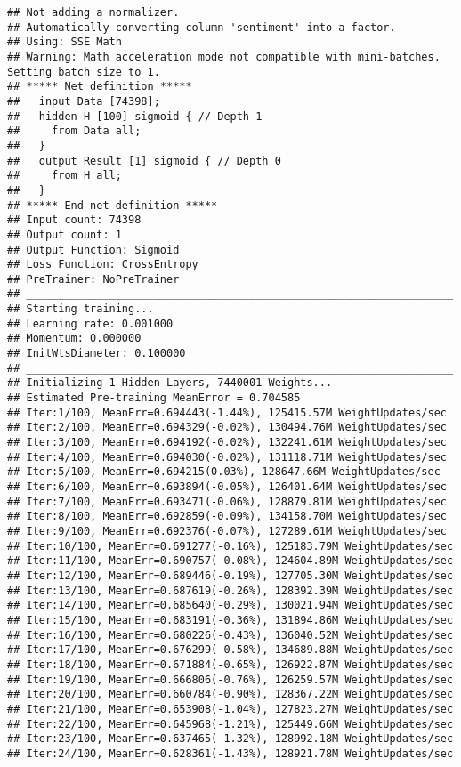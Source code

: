 \documentclass[]{book}
\theoremstyle{definition}
\theoremstyle{definition}
\theoremstyle{definition}
\theoremstyle{remark}
\begin{document}
\begin{verbatim}
## Not adding a normalizer.
## Automatically converting column 'sentiment' into a factor.
## Using: SSE Math
## Warning: Math acceleration mode not compatible with mini-batches. Setting batch size to 1.
## ***** Net definition *****
##   input Data [74398];
##   hidden H [100] sigmoid { // Depth 1
##     from Data all;
##   }
##   output Result [1] sigmoid { // Depth 0
##     from H all;
##   }
## ***** End net definition *****
## Input count: 74398
## Output count: 1
## Output Function: Sigmoid
## Loss Function: CrossEntropy
## PreTrainer: NoPreTrainer
## ___________________________________________________________________
## Starting training...
## Learning rate: 0.001000
## Momentum: 0.000000
## InitWtsDiameter: 0.100000
## ___________________________________________________________________
## Initializing 1 Hidden Layers, 7440001 Weights...
## Estimated Pre-training MeanError = 0.704585
## Iter:1/100, MeanErr=0.694443(-1.44%), 125415.57M WeightUpdates/sec
## Iter:2/100, MeanErr=0.694329(-0.02%), 130494.76M WeightUpdates/sec
## Iter:3/100, MeanErr=0.694192(-0.02%), 132241.61M WeightUpdates/sec
## Iter:4/100, MeanErr=0.694030(-0.02%), 131118.71M WeightUpdates/sec
## Iter:5/100, MeanErr=0.694215(0.03%), 128647.66M WeightUpdates/sec
## Iter:6/100, MeanErr=0.693894(-0.05%), 126401.64M WeightUpdates/sec
## Iter:7/100, MeanErr=0.693471(-0.06%), 128879.81M WeightUpdates/sec
## Iter:8/100, MeanErr=0.692859(-0.09%), 134158.70M WeightUpdates/sec
## Iter:9/100, MeanErr=0.692376(-0.07%), 127289.61M WeightUpdates/sec
## Iter:10/100, MeanErr=0.691277(-0.16%), 125183.79M WeightUpdates/sec
## Iter:11/100, MeanErr=0.690757(-0.08%), 124604.89M WeightUpdates/sec
## Iter:12/100, MeanErr=0.689446(-0.19%), 127705.30M WeightUpdates/sec
## Iter:13/100, MeanErr=0.687619(-0.26%), 128392.39M WeightUpdates/sec
## Iter:14/100, MeanErr=0.685640(-0.29%), 130021.94M WeightUpdates/sec
## Iter:15/100, MeanErr=0.683191(-0.36%), 131894.86M WeightUpdates/sec
## Iter:16/100, MeanErr=0.680226(-0.43%), 136040.52M WeightUpdates/sec
## Iter:17/100, MeanErr=0.676299(-0.58%), 134689.88M WeightUpdates/sec
## Iter:18/100, MeanErr=0.671884(-0.65%), 126922.87M WeightUpdates/sec
## Iter:19/100, MeanErr=0.666806(-0.76%), 126259.57M WeightUpdates/sec
## Iter:20/100, MeanErr=0.660784(-0.90%), 128367.22M WeightUpdates/sec
## Iter:21/100, MeanErr=0.653908(-1.04%), 127823.27M WeightUpdates/sec
## Iter:22/100, MeanErr=0.645968(-1.21%), 125449.66M WeightUpdates/sec
## Iter:23/100, MeanErr=0.637465(-1.32%), 128992.18M WeightUpdates/sec
## Iter:24/100, MeanErr=0.628361(-1.43%), 128921.78M WeightUpdates/sec

\end{verbatim}
\end{document}
